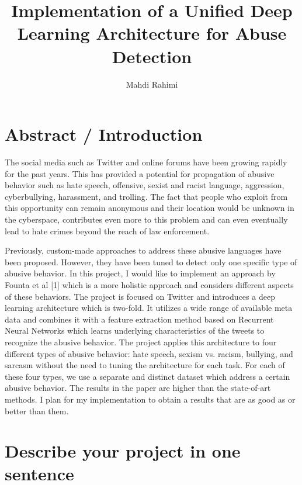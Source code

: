\documentclass[11pt, twocolumn]{article}
\begin{document}
\title{Implementation of a Unified Deep Learning Architecture for Abuse Detection}

\author{Mahdi Rahimi}

\maketitle

\section{Abstract / Introduction}

The social media such as Twitter and online forums have been growing rapidly for the past years. This has provided a potential for propagation of abusive behavior such as hate speech, offensive, sexist and racist language, aggression, cyberbullying, harassment, and trolling. The fact that people who exploit from this opportunity can remain anonymous and their location would be unknown in the cyberspace, contributes even more to this problem and can even eventually lead to hate crimes beyond the reach of law enforcement.

Previously, custom-made approaches to address these abusive languages have been proposed. However, they have been tuned to detect only one specific type of abusive behavior. In this project, I would like to implement an approach by Founta et al [1] which is a more holistic approach and considers different aspects of these behaviors. The project is focused on Twitter and introduces a deep learning architecture which is two-fold. It utilizes a wide range of available meta data and combines it with a feature extraction method based on Recurrent Neural Networks which learns underlying characteristics of the tweets to recognize the abusive behavior. The project applies this architecture to four different types of abusive behavior: hate speech, sexism vs. racism, bullying, and sarcasm without the need to tuning the architecture for each task. For each of these four types, we use a separate and distinct dataset which address a certain abusive behavior. The results in the paper are higher than the state-of-art methods. I plan for my implementation to obtain a results that are as good as or better than them.

\section{Describe your project in one sentence}
\end{document}
